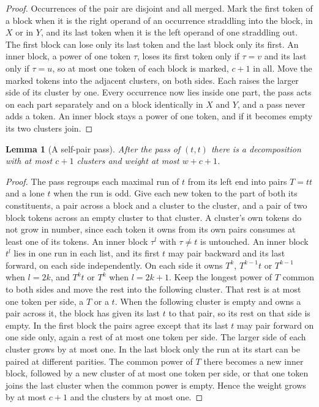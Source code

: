 \documentclass[11pt,a4paper]{article}
\theoremstyle{definition}
\theoremstyle{plain}
\newtheorem{lemma}{Lemma}
\begin{document}
\begin{proof}
Occurrences of the pair are disjoint and all merged. Mark the first token of a block when it is the right operand of an
occurrence straddling into the block, in \(X\) or in \(Y\), and its last token when it is the left operand of one
straddling out. The first block can lose only its last token and the last block only its first. An inner block, a power
of one token \(\tau\), loses its first token only if \(\tau = v\) and its last only if \(\tau = u\), so at most one
token of each block is marked, \(c + 1\) in all. Move the marked tokens into the adjacent clusters, on both sides. Each
raises the larger side of its cluster by one. Every occurrence now lies inside one part, the pass acts on each part
separately and on a block identically in \(X\) and \(Y\), and a pass never adds a token. An inner block stays a power of
one token, and if it becomes empty its two clusters join.
\end{proof}

\begin{lemma}[A self-pair pass]\label{lem:passself}
After the pass of \((t, t)\) there is a decomposition with at most \(c + 1\) clusters and weight at most \(w + c + 1\).
\end{lemma}

\begin{proof}
The pass regroups each maximal run of \(t\) from its left end into pairs \(T = tt\) and a lone \(t\) when the run is
odd. Give each new token to the part of both its constituents, a pair across a block and a cluster to the cluster, and a
pair of two block tokens across an empty cluster to that cluster. A cluster's own tokens do not grow in number, since
each token it owns from its own pairs consumes at least one of its tokens. An inner block \(\tau^l\) with \(\tau \ne t\)
is untouched. An inner block \(t^l\) lies in one run in each list, and its first \(t\) may pair backward and its last
forward, on each side independently. On each side it owns \(T^k\), \(T^{k-1}t\) or \(T^{k-1}\) when \(l = 2k\), and
\(T^k t\) or \(T^k\) when \(l = 2k + 1\). Keep the longest power of \(T\) common to both sides and move the rest into
the following cluster. That rest is at most one token per side, a \(T\) or a \(t\). When the following cluster is empty
and owns a pair across it, the block has given its last \(t\) to that pair, so its rest on that side is empty. In the
first block the pairs agree except that its last \(t\) may pair forward on one side only, again a rest of at most one
token per side. The larger side of each cluster grows by at most one. In the last block only the run at its start can be
paired at different parities. The common power of \(T\) there becomes a new inner block, followed by a new cluster of at
most one token per side, or that one token joins the last cluster when the common power is empty. Hence the weight grows
by at most \(c + 1\) and the clusters by at most one.
\end{proof}
\end{document}
